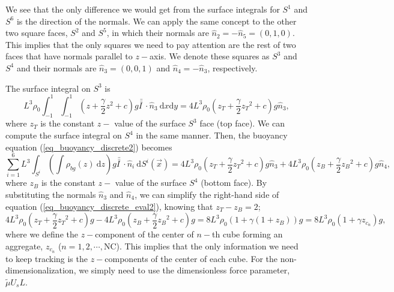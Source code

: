We see that the only difference we would get from the surface integrals for $S^1$ and $S^6$ is the direction of the normals. We can apply the same concept to the other two square faces, $S^2$ and $S^5$, in which their normals are $\hat{n}_2 = -\hat{n}_5 = (0,1,0)$. This implies that the only squares we need to pay attention are the rest of two faces that have normals parallel to $z-$axis. We denote these squares as $S^3$ and $S^4$ and their normals are $\hat{n}_3 = (0,0,1)$ and $\hat{n}_4 = -\hat{n}_{3}$, respectively. 
\par
The surface integral on $S^3$ is 
\[ L^3
\rho_0\int_{-1}^{1} \int_{-1}^{1}
  	\left( 
  	 z + \frac{\gamma}{2}{z}^2 + c 
 	\right)g  \bar{\bar{I \ }}  \cdot
 	\hat{n}_3 \ 
	\textrm{d}x  \textrm{d}y 
	= 4 L^3 \rho_0 \left( z_T + \frac{\gamma}{2} {z_T}^{2} +c \right) g \hat{n}_3,
\]
where $z_T$ is the constant $z-$ value of the surface $S^3$ face (top face).
We can compute the surface integral on $S^4$ in the same manner. Then, the buoyancy equation (\ref{eq_buoyancy_discrete2}) becomes
\begin{equation}
	\sum_{i=1}^{6} L^3
	 \int_{S^i} \left( 
	   \int  {\rho_{bg}} (z)  \ \textrm{d}z 
	 \right) g \bar{\bar{I \ }}  \cdot
	\hat{n}_i \ \textrm{d}S^i (\vec{x})
	= 4 L^3 \rho_0 \left( z_T + \frac{\gamma}{2} {z_T}^{2} +c \right) g \hat{n}_3
	+ 4L^3 \rho_0 \left( z_B + \frac{\gamma}{2} {z_B}^{2} + c \right) g \hat{n}_4,
\label{eq_buoyancy_discrete_eval2}
\end{equation}
where $z_B$ is the constant $z-$ value of the surface $S^4$ (bottom face). By substituting the normals $\hat{n}_3$ and $\hat{n}_4$, we can simplify the right-hand side of equation (\ref{eq_buoyancy_discrete_eval2}), knowing that $z_T - z_B = 2$;
\begin{equation}
4 L^3 \rho_0 \left( z_T + \frac{\gamma}{2} {z_T}^{2} + c \right) g 
	- 4 L^3 \rho_0 \left( z_B + \frac{\gamma}{2} {z_B}^{2} + c \right) g
= 8 L^3 \rho_0 \left( 1+ \gamma (1+z_B) \right)g
= 8 L^3 \rho_0 \left( 1+ \gamma z_{c_n} \right) g , 
\label{eq_buoyancy_z_eval2}
\end{equation}
where we define the $z-$component of the center of $n-$th cube forming an aggregate, $z_{c_n}$ ($ n = 1, 2, \cdots, $NC).
 This implies that the only information we need to keep tracking is the $z-$components of the center of each cube. For the non-dimensionalization, we simply need to use the dimensionless force parameter, $\tilde{\mu} U_s L$.


